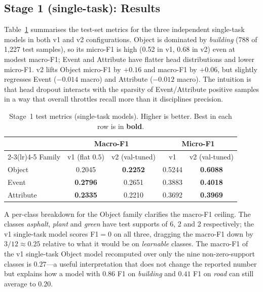 \documentclass[journal]{IEEEtran}
\begin{document}
\subsection{Stage 1 (single-task): Results}\label{ssec:results-stage1}

Table~\ref{tab:single-task} summarises the test-set metrics for the three independent single-task models in both v1 and v2 configurations. Object is dominated by \emph{building} (788 of 1{,}227 test samples), so its micro-F1 is high (0.52 in v1, 0.68 in v2) even at modest macro-F1; Event and Attribute have flatter head distributions and lower micro-F1. v2 lifts Object micro-F1 by $+0.16$ and macro-F1 by $+0.06$, but slightly regresses Event ($-0.014$ macro) and Attribute ($-0.012$ macro). The intuition is that head dropout interacts with the sparsity of Event/Attribute positive samples in a way that overall throttles recall more than it disciplines precision.

\begin{table}[!t]
\caption{Stage~1 test metrics (single-task models). Higher is better. Best in each row is in \textbf{bold}.}
\label{tab:single-task}
\centering
\small
\begin{tabular}{@{}lcccc@{}}
\toprule
 & \multicolumn{2}{c}{Macro-F1} & \multicolumn{2}{c}{Micro-F1} \\
\cmidrule(lr){2-3}\cmidrule(lr){4-5}
Family & v1 (flat $0.5$) & v2 (val-tuned) & v1 & v2 (val-tuned) \\
\midrule
Object     & 0.2045 & \textbf{0.2252} & 0.5244 & \textbf{0.6088} \\
Event      & \textbf{0.2796} & 0.2651 & 0.3883 & \textbf{0.4018} \\
Attribute  & \textbf{0.2335} & 0.2210 & 0.3692 & \textbf{0.3969} \\
\bottomrule
\end{tabular}
\end{table}

A per-class breakdown for the Object family clarifies the macro-F1 ceiling.
The classes \emph{asphalt}, \emph{plant} and \emph{green} have test supports of 6, 2 and 2 respectively; the v1 single-task model scores F1$=0$ on all three, dragging the macro-F1 down by $3/12 \approx 0.25$ relative to what it would be on \emph{learnable} classes. The macro-F1 of the v1 single-task Object model recomputed over only the nine non-zero-support classes is $0.27$---a useful interpretation that does not change the reported number but explains how a model with $0.86$ F1 on \emph{building} and $0.41$ F1 on \emph{road} can still average to $0.20$.
\end{document}
